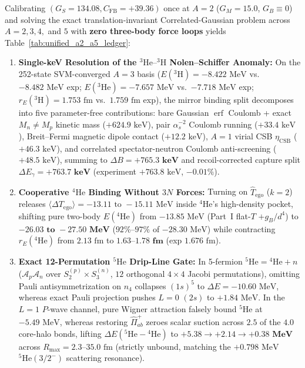 \documentclass[11pt, a4paper]{article}
\DeclareRobustCommand{\Rmax}{R_{\max}}
\begin{document}
Calibrating $(G_S = 134.08, C_{\mathrm{FB}} = +39.36)$ once at $A = 2$ ($G_M = 15.0$, $G_B \equiv 0$) and solving the exact translation-invariant Correlated-Gaussian problem across $A = 2, 3, 4,$ and $5$ with \textbf{zero three-body force loops} yields Table~\ref{tab:unified_a2_a5_ledger}:
\begin{enumerate}[leftmargin=1.8em, itemsep=2pt]
    \item \textbf{Single-keV Resolution of the $^3\text{He}\text{--}{}^3\text{H}$ Nolen--Schiffer Anomaly:} On the 252-state SVM-converged $A = 3$ basis ($E(^3\text{H}) = -8.422\text{ MeV}$ vs.\ $-8.482\text{ MeV}$ exp; $E(^3\text{He}) = -7.657\text{ MeV}$ vs.\ $-7.718\text{ MeV}$ exp; $r_E(^3\text{H}) = 1.753\text{ fm}$ vs.\ $1.759\text{ fm}$ exp), the mirror binding split decomposes into five parameter-free contributions: bare Gaussian $\operatorname{erf}$ Coulomb + exact $M_n \neq M_p$ kinetic mass ($+624.9\text{ keV}$), pair $\alpha_s^{-2}$ Coulomb running ($+33.4\text{ keV}$), Breit--Fermi magnetic dipole contact ($+12.2\text{ keV}$), $A = 1$ virial CSB $\eta_{\mathrm{CSB}}$ ($+46.3\text{ keV}$), and correlated spectator-neutron Coulomb anti-screening ($+48.5\text{ keV}$), summing to $\Delta B = \mathbf{+765.3\text{ keV}}$ and recoil-corrected capture split $\Delta E_\gamma = \mathbf{+763.7\text{ keV}}$ (experiment $+763.8\text{ keV}$, $-0.01\%$).
    \item \textbf{Cooperative $^4\text{He}$ Binding Without $3N$ Forces:} Turning on $\hat{T}_{\mathrm{ego}}$ ($k = 2$) releases $\langle\Delta T_{\mathrm{ego}}\rangle = -13.11\text{ to }-15.11\text{ MeV}$ inside $^4\text{He}$'s high-density pocket, shifting pure two-body $E(^4\text{He})$ from $-13.85\text{ MeV}$ (Part~I flat-$T$ $+g_B/d^4$) to $\mathbf{-26.03\text{ to }-27.50\text{ MeV}}$ ($92\%\text{--}97\%$ of $-28.30\text{ MeV}$) while contracting $r_E(^4\text{He})$ from $2.13\text{ fm}$ to $\mathbf{1.63\text{--}1.78\text{ fm}}$ (exp $1.676\text{ fm}$).
    \item \textbf{Exact 12-Permutation $^5\text{He}$ Drip-Line Gate:} In 5-fermion $^5\text{He} = {}^4\text{He} + n$ ($\mathcal{A}_p\mathcal{A}_n$ over $S_2^{(p)}\times S_3^{(n)}$, $12$ orthogonal $4\times 4$ Jacobi permutations), omitting Pauli antisymmetrization on $n_4$ collapses $(1s)^5$ to $\Delta E = -10.60\text{ MeV}$, whereas exact Pauli projection pushes $L = 0$ $(2s)$ to $+1.84\text{ MeV}$. In the $L = 1$ $P$-wave channel, pure Wigner attraction falsely bound $^5\text{He}$ at $-5.49\text{ MeV}$, whereas restoring $\hat{\Pi}_{ab}^+$ zeroes scalar suction across $2.5$ of the $4.0$ core-halo bonds, lifting $\Delta E(^5\text{He} - {}^4\text{He})$ to $\mathbf{+5.38 \to +2.14 \to +0.38\text{ MeV}}$ across $\Rmax = 2.3\text{--}35.0\text{ fm}$ (strictly unbound, matching the $+0.798\text{ MeV}$ $^5\text{He}(3/2^-)$ scattering resonance).
\end{enumerate}
\end{document}
